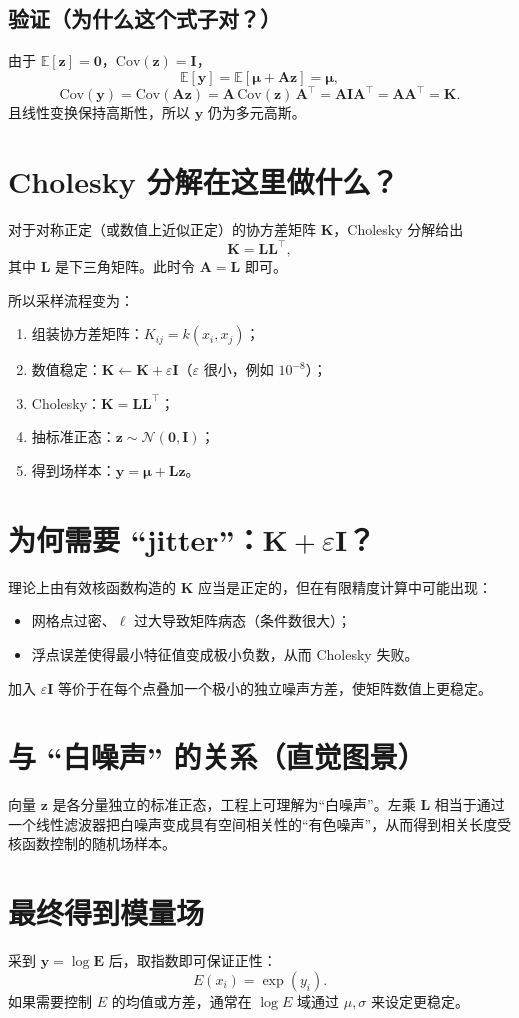 \documentclass[11pt,a4paper]{article}
\begin{document}
\subsection*{验证（为什么这个式子对？）}
由于 $\mathbb{E}[\bm{z}]=\bm{0}$，$\mathrm{Cov}(\bm{z})=\bm{I}$，
\[
\mathbb{E}[\bm{y}]=\mathbb{E}[\bm{\mu}+\bm{A}\bm{z}]=\bm{\mu},
\]
\[
\mathrm{Cov}(\bm{y})
=\mathrm{Cov}(\bm{A}\bm{z})
=\bm{A}\,\mathrm{Cov}(\bm{z})\,\bm{A}^\top
=\bm{A}\bm{I}\bm{A}^\top
=\bm{A}\bm{A}^\top
=\bm{K}.
\]
且线性变换保持高斯性，所以 $\bm{y}$ 仍为多元高斯。

\section{Cholesky 分解在这里做什么？}

对于对称正定（或数值上近似正定）的协方差矩阵 $\bm{K}$，Cholesky 分解给出
\[
\bm{K}=\bm{L}\bm{L}^\top,
\]
其中 $\bm{L}$ 是下三角矩阵。此时令 $\bm{A}=\bm{L}$ 即可。

所以采样流程变为：
\begin{enumerate}
\item 组装协方差矩阵：$K_{ij}=k(x_i,x_j)$；
\item 数值稳定：$\bm{K}\leftarrow \bm{K}+\varepsilon \bm{I}$（$\varepsilon$ 很小，例如 $10^{-8}$）；
\item Cholesky：$\bm{K}=\bm{L}\bm{L}^\top$；
\item 抽标准正态：$\bm{z}\sim \mathcal{N}(\bm{0},\bm{I})$；
\item 得到场样本：$\bm{y}=\bm{\mu}+\bm{L}\bm{z}$。
\end{enumerate}

\section{为何需要 ``jitter''：$\bm{K}+\varepsilon\bm{I}$？}

理论上由有效核函数构造的 $\bm{K}$ 应当是正定的，但在有限精度计算中可能出现：
\begin{itemize}
\item 网格点过密、$\ell$ 过大导致矩阵病态（条件数很大）；
\item 浮点误差使得最小特征值变成极小负数，从而 Cholesky 失败。
\end{itemize}
加入 $\varepsilon\bm{I}$ 等价于在每个点叠加一个极小的独立噪声方差，使矩阵数值上更稳定。

\section{与 ``白噪声'' 的关系（直觉图景）}

向量 $\bm{z}$ 是各分量独立的标准正态，工程上可理解为“白噪声”。左乘 $\bm{L}$ 相当于通过一个线性滤波器把白噪声变成具有空间相关性的“有色噪声”，从而得到相关长度受核函数控制的随机场样本。

\section{最终得到模量场}

采到 $\bm{y}=\log \bm{E}$ 后，取指数即可保证正性：
\[
E(x_i)=\exp(y_i).
\]
如果需要控制 $E$ 的均值或方差，通常在 $\log E$ 域通过 $\mu,\sigma$ 来设定更稳定。
\end{document}
